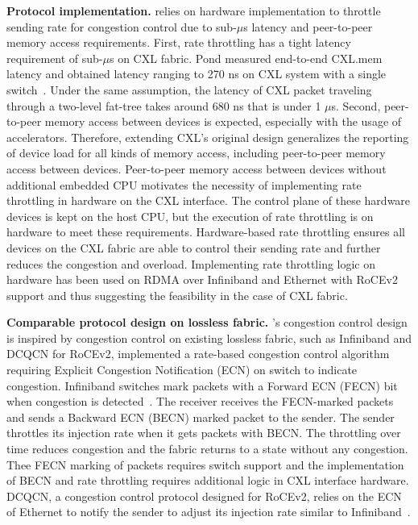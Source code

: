 \noindent \textbf{Protocol implementation.}
\aurelia relies on hardware implementation to throttle sending rate for congestion control due to sub-$\mu$s latency and peer-to-peer memory access requirements.
%
First, rate throttling has a tight latency requirement of sub-$\mu$s on CXL fabric.
%
Pond measured end-to-end CXL.mem latency and obtained latency ranging to 270 ns on CXL system with a single switch~\cite{cxl:hoti:2022, pond:asplos:2023}. 
%
Under the same assumption, the latency of CXL packet traveling through a two-level fat-tree takes around 680 ns that is under 1 $\mu$s.
%
Second, peer-to-peer memory access between devices is expected, especially with the usage of accelerators. Therefore, \aurelia extending CXL's original design generalizes the reporting of device load for all kinds of memory access, including peer-to-peer memory access between devices.
%
Peer-to-peer memory access between devices without additional embedded CPU motivates the necessity of implementing rate throttling in hardware on the CXL interface. 
%
The control plane of these hardware devices is kept on the host CPU, but the execution of rate throttling is on hardware to meet these requirements.  
%
Hardware-based rate throttling ensures all devices on the CXL fabric are able to control their sending rate and further reduces the congestion and overload.
%
Implementing rate throttling logic on hardware has been used on RDMA over Infiniband and Ethernet with RoCEv2 support and thus suggesting the feasibility in the case of CXL fabric. 

\noindent \textbf{Comparable protocol design on lossless fabric.}
\aurelia's congestion control design is inspired by congestion control on existing lossless fabric, such as Infiniband and DCQCN for RoCEv2, implemented a rate-based congestion control algorithm requiring Explicit Congestion Notification (ECN) on switch to indicate congestion.
%
Infiniband switches mark packets with a Forward ECN (FECN) bit when congestion is detected~\cite{infiniband-spec}. 
%
The receiver receives the FECN-marked packets and sends a Backward ECN (BECN) marked packet to the sender.
% 
The sender throttles its injection rate when it gets packets with BECN. The throttling over time reduces congestion and the fabric returns to a state without any congestion. 
%
Thee FECN marking of packets requires switch support and the implementation of BECN and rate throttling requires additional logic in CXL interface hardware.
%
DCQCN, a congestion control protocol designed for RoCEv2, relies on the ECN of Ethernet to notify the sender to adjust its injection rate similar to Infiniband~\cite{dcqcn:sigcomm:2015}.
%
